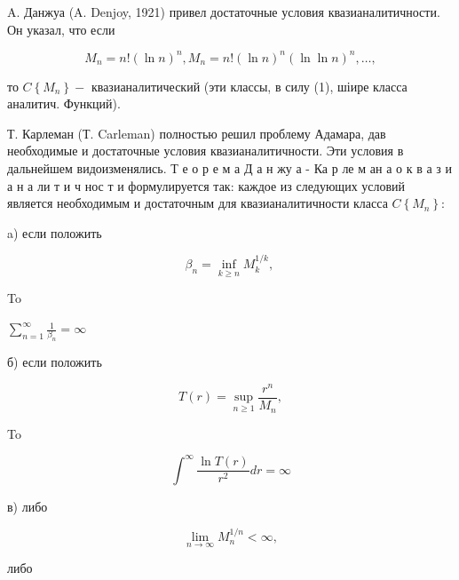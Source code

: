 \documentclass[10pt]{article}
\begin{document}
A. Данжуа (A. Denjoy, 1921) привел достаточные условия квазианалитичности. Он указал, что если



\[

M_{n}=n !(\ln n)^{n}, M_{n}=n !(\ln n)^{n}(\ln \ln n)^{n}, \ldots,

\]



то $C\left\{M_{n}\right\}-$ квазианалитический (эти классы, в силу (1), шіире класса аналитич. Функций).



Т. Карлеман (Т. Carleman) полностью решил проблему Адамара, дав необходимые и достаточные условия квазианалитичности. Эти условия в дальнейшем видоизменялись. Т е о р е м а Д а н жу а - Ка р ле м ан а о к в а з и а н а ли т и ч нос т и формулируется так: каждое из следующих условий является необходимым и достаточным для квазианалитичности класса $C\left\{M_{n}\right\}:$



a) если положить



\[

\beta_{n}=\inf _{k \geqslant n} M_{k}^{1 / k} \text {, }

\]



To



$\sum_{n=1}^{\infty} \frac{1}{\beta_{n}}=\infty$



б) если положить



\[

T(r)=\sup _{n \geqslant 1} \frac{r^{n}}{M_{n}},

\]



To



\[

\int^{\infty} \frac{\ln T(r)}{r^{2}} d r=\infty

\]



в) либо



\[

\lim _{n \rightarrow \infty} M_{n}^{1 / n}<\infty,

\]



либо
\end{document}
